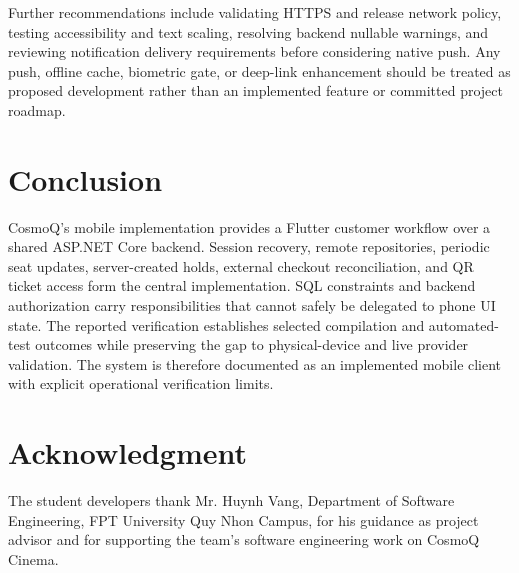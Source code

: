 \documentclass[conference]{IEEEtran}
\begin{document}
Further recommendations include validating HTTPS and release network policy,
testing accessibility and text scaling, resolving backend nullable warnings,
and reviewing notification delivery requirements before considering native
push. Any push, offline cache, biometric gate, or deep-link enhancement should
be treated as proposed development rather than an implemented feature or
committed project roadmap.

\section{Conclusion}
CosmoQ's mobile implementation provides a Flutter customer workflow over a
shared ASP.NET Core backend. Session recovery, remote repositories, periodic
seat updates, server-created holds, external checkout reconciliation, and QR
ticket access form the central implementation. SQL constraints and backend
authorization carry responsibilities that cannot safely be delegated to phone
UI state. The reported verification establishes selected compilation and
automated-test outcomes while preserving the gap to physical-device and live
provider validation. The system is therefore documented as an implemented
mobile client with explicit operational verification limits.
\section*{Acknowledgment}
The student developers thank Mr. Huynh Vang, Department of Software Engineering,
FPT University Quy Nhon Campus, for his guidance as project advisor and for
supporting the team's software engineering work on CosmoQ Cinema.


\end{document}
